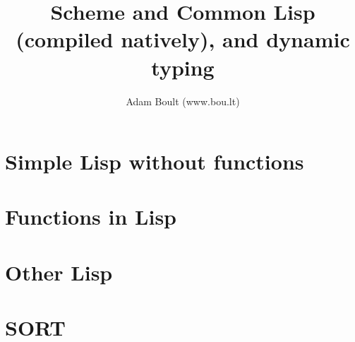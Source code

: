 \documentclass[oneside]{book}
\begin{document}
\author{Adam Boult (www.bou.lt)}
\title{Scheme and Common Lisp (compiled natively), and dynamic typing}
\maketitle

\setcounter{tocdepth}{0}
\tableofcontents



\part{Simple Lisp without functions}





\part{Functions in Lisp}

\part{Other Lisp}

\part{SORT}

\end{document}

